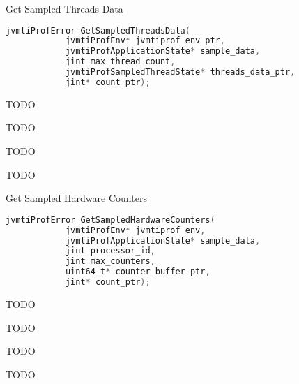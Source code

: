 \begin{apidef}{Get Sampled Threads Data}
\begin{lstlisting}[language=C]
jvmtiProfError GetSampledThreadsData(
            jvmtiProfEnv* jvmtiprof_env_ptr,
            jvmtiProfApplicationState* sample_data,
            jint max_thread_count,
            jvmtiProfSampledThreadState* threads_data_ptr,
            jint* count_ptr);
\end{lstlisting}

\begin{apidesc}
TODO
\end{apidesc}

\begin{apiphase}
TODO
\end{apiphase}

\begin{apicap}
TODO
\end{apicap}

\begin{apiparam}
\end{apiparam}

\begin{apireturn}
TODO
\end{apireturn}

\begin{apierror}
\end{apierror}
\end{apidef}
\begin{apidef}{Get Sampled Hardware Counters}
\begin{lstlisting}[language=C]
jvmtiProfError GetSampledHardwareCounters(
            jvmtiProfEnv* jvmtiprof_env,
            jvmtiProfApplicationState* sample_data,
            jint processor_id,
            jint max_counters,
            uint64_t* counter_buffer_ptr,
            jint* count_ptr);
\end{lstlisting}

\begin{apidesc}
TODO
\end{apidesc}

\begin{apiphase}
TODO
\end{apiphase}

\begin{apicap}
TODO
\end{apicap}

\begin{apiparam}
\end{apiparam}

\begin{apireturn}
TODO
\end{apireturn}

\begin{apierror}
\end{apierror}
\end{apidef}
